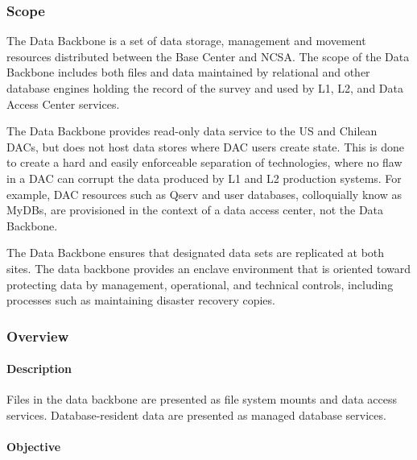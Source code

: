 ﻿\subsubsection{Scope}

The Data Backbone is a set of data storage, management and movement
resources distributed between the Base Center and NCSA. The
scope of the Data Backbone includes both files and data maintained by relational
and other database engines holding the record of the survey and used by
L1, L2, and Data Access Center services.

The Data Backbone provides read-only data service to the US and Chilean
DACs, but does not host data stores where DAC users create state. This is
done to create a hard and easily enforceable separation of technologies,
where no flaw in a DAC can corrupt the data produced by L1 and L2
production systems. For example, DAC resources such as Qserv and user databases,
colloquially know as MyDBs, are provisioned in the context of a data
access center, not the Data Backbone.

The Data Backbone ensures that designated data sets are replicated at both sites.
The data backbone provides an enclave environment that is oriented toward
protecting data by management, operational, and technical controls,
including processes such as maintaining disaster recovery copies.

\subsubsection{Overview}

\paragraph{Description}

Files in the data backbone are presented as file system mounts and data access
services. Database-resident data are presented as managed database services.

\paragraph{Objective}

